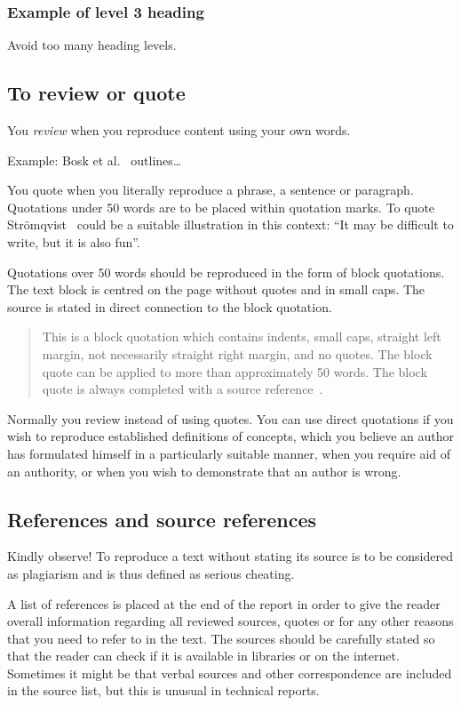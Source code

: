 \subsubsection{Example of level 3 heading}\label{subsubsec:exampleoflevel3heading}
Avoid too many heading levels.

\subsection{To review or quote}\label{subsec:torevieworquote}
You \emph{review} when you reproduce content using your own words.

Example: Bosk et al.~\cite{bosk2015towards} outlines\dots

You quote when you literally reproduce a phrase, a sentence or paragraph.
Quotations under 50 words are to be placed within quotation marks. To quote
Strömqvist~\cite{stromquist2000skrivboken} could be a suitable illustration in
this context: ``It may be difficult to write, but it is also fun''.

Quotations over 50 words should be reproduced in the form of block quotations.
The text block is centred on the page without quotes and in small caps. The
source is stated in direct connection to the block quotation.

\begin{quote}
This is a block quotation which contains indents, small caps, straight left
margin, not necessarily straight right margin, and no quotes. The block quote
can be applied to more than approximately 50 words. The block quote is always
completed with a source reference~\cite{stromquist2000skrivboken}.
\end{quote}

Normally you review instead of using quotes. You can use direct quotations if
you wish to reproduce established definitions of concepts, which you believe an
author has formulated himself in a particularly suitable manner, when you
require aid of an authority, or when you wish to demonstrate that an author is
wrong.

\subsection{References and source references}\label{subsec:referencesandsourcereferences}
Kindly observe! To reproduce a text without stating its source is to be
considered as plagiarism and is thus defined as serious cheating.

A list of references is placed at the end of the report in order to give the
reader overall information regarding all reviewed sources, quotes or for any
other reasons that you need to refer to in the text. The sources should be
carefully stated so that the reader can check if it is available in libraries or
on the internet. Sometimes it might be that verbal sources and other
correspondence are included in the source list, but this is unusual in technical
reports.

